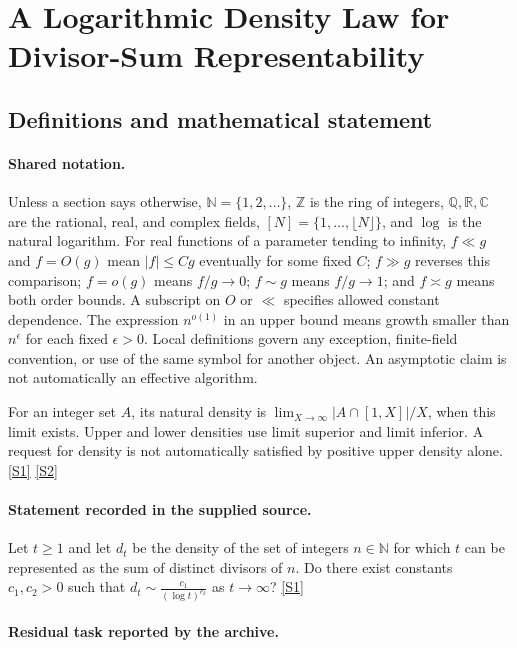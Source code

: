 \documentclass[11pt,a4paper]{article}
\newcommand{\N}{\mathbb{N}}
\newcommand{\Z}{\mathbb{Z}}
\newcommand{\Q}{\mathbb{Q}}
\newcommand{\R}{\mathbb{R}}
\newcommand{\C}{\mathbb{C}}
\newcommand{\sref}[2]{\hyperlink{source:#1:#2}{[S#2]}}
\begin{document}
\section{A Logarithmic Density Law for Divisor-Sum Representability}\label{statement}


\subsection{Definitions and mathematical statement}

\paragraph{Shared notation.}Unless a section says otherwise, $\N=\{1,2,\ldots\}$,
$\Z$ is the ring of integers, $\Q,\R,\C$ are the rational, real, and complex
fields, $[N]=\{1,\ldots,\lfloor N\rfloor\}$, and $\log$ is the natural
logarithm. For real functions of a parameter tending to infinity,
$f\ll g$ and $f=O(g)$ mean $|f|\leq Cg$ eventually for some fixed $C$;
$f\gg g$ reverses this comparison; $f=o(g)$ means $f/g\to0$;
$f\sim g$ means $f/g\to1$; and $f\asymp g$ means both order bounds.
A subscript on $O$ or $\ll$ specifies allowed constant dependence.
The expression $n^{o(1)}$ in an upper bound means growth smaller than
$n^\epsilon$ for each fixed $\epsilon>0$. Local definitions govern any
exception, finite-field convention, or use of the same symbol for another
object. An asymptotic claim is not automatically an effective algorithm.



For an integer set $A$, its natural density is $\lim_{X\to\infty}|A\cap[1,X]|/X$, when this limit exists. Upper and lower densities use limit superior and limit inferior. A request for density is not automatically satisfied by positive upper density alone. \sref{statement}{1} \sref{statement}{2}

\paragraph{Statement recorded in the supplied source.}
Let $t\geq 1$ and let $d_t$ be the density of the set of integers $n\in\mathbb{N}$ for which $t$ can be represented as the sum of distinct divisors of $n$.
Do there exist constants $c_1,c_2>0$ such that $ d_t \sim \frac{c_1}{(\log t)^{c_2}} $ as $t\to \infty$? \sref{statement}{1}

\paragraph{Residual task reported by the archive.}
\end{document}
